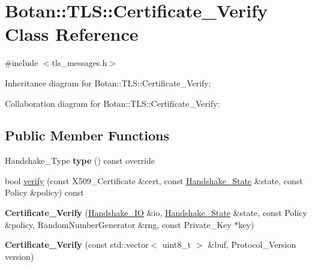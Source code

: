 \hypertarget{class_botan_1_1_t_l_s_1_1_certificate___verify}{}\section{Botan\+:\+:T\+LS\+:\+:Certificate\+\_\+\+Verify Class Reference}
\label{class_botan_1_1_t_l_s_1_1_certificate___verify}


{\ttfamily \#include $<$tls\+\_\+messages.\+h$>$}



Inheritance diagram for Botan\+:\+:T\+LS\+:\+:Certificate\+\_\+\+Verify\+:


Collaboration diagram for Botan\+:\+:T\+LS\+:\+:Certificate\+\_\+\+Verify\+:
\subsection*{Public Member Functions}
\begin{DoxyCompactItemize}
\item 
\mbox{\label{class_botan_1_1_t_l_s_1_1_certificate___verify_a15a8df0c466894734bc8544b04db7e66}} 
Handshake\+\_\+\+Type {\bfseries type} () const override
\item 
bool \mbox{\hyperlink{class_botan_1_1_t_l_s_1_1_certificate___verify_ac61de3a15e95ef6803a0fa8542d392e6}{verify}} (const X509\+\_\+\+Certificate \&cert, const \mbox{\hyperlink{class_botan_1_1_t_l_s_1_1_handshake___state}{Handshake\+\_\+\+State}} \&state, const Policy \&policy) const
\item 
\mbox{\label{class_botan_1_1_t_l_s_1_1_certificate___verify_a022fbdd2fd89b671eeb0dd3ab20b7249}} 
{\bfseries Certificate\+\_\+\+Verify} (\mbox{\hyperlink{class_botan_1_1_t_l_s_1_1_handshake___i_o}{Handshake\+\_\+\+IO}} \&io, \mbox{\hyperlink{class_botan_1_1_t_l_s_1_1_handshake___state}{Handshake\+\_\+\+State}} \&state, const Policy \&policy, Random\+Number\+Generator \&rng, const Private\+\_\+\+Key $\ast$key)
\item 
\mbox{\label{class_botan_1_1_t_l_s_1_1_certificate___verify_ae2838535baed1081983fadb99fa9b21e}} 
{\bfseries Certificate\+\_\+\+Verify} (const std\+::vector$<$ uint8\+\_\+t $>$ \&buf, Protocol\+\_\+\+Version version)
\end{DoxyCompactItemize}


